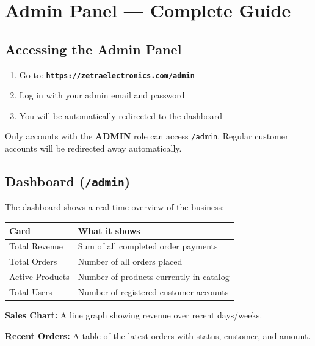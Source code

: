 \documentclass[12pt,a4paper]{article}
\begin{document}
\section{Admin Panel — Complete Guide}

\subsection{Accessing the Admin Panel}

\begin{enumerate}[leftmargin=2em, itemsep=4pt]
  \item Go to: \textbf{\texttt{https://zetraelectronics.com/admin}}
  \item Log in with your admin email and password
  \item You will be automatically redirected to the dashboard
\end{enumerate}

\begin{infobox}
Only accounts with the \textbf{ADMIN} role can access \texttt{/admin}. Regular customer accounts will be redirected away automatically.
\end{infobox}

\subsection{Dashboard (\texttt{/admin})}

The dashboard shows a real-time overview of the business:

\begin{tabular}{@{}L{4.5cm} L{8.5cm}@{}}
\toprule
\textbf{Card} & \textbf{What it shows} \\
\midrule
Total Revenue & Sum of all completed order payments \\
Total Orders & Number of all orders placed \\
Active Products & Number of products currently in catalog \\
Total Users & Number of registered customer accounts \\
\bottomrule
\end{tabular}

\vspace{0.5em}
\textbf{Sales Chart:} A line graph showing revenue over recent days/weeks.

\textbf{Recent Orders:} A table of the latest orders with status, customer, and amount.
\end{document}
